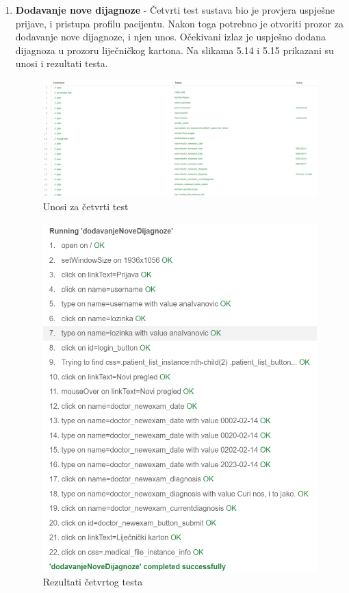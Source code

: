 \begin{enumerate}
			 	\item \textbf{Dodavanje nove dijagnoze} - Četvrti test sustava bio je provjera uspješne prijave, i pristupa profilu pacijentu. Nakon toga potrebno je otvoriti prozor za dodavanje nove dijagnoze, i njen unos. Očekivani izlaz je uspješno dodana dijagnoza u prozoru liječničkog kartona. Na slikama 5.14 i 5.15 prikazani su unosi i rezultati testa.
			 	\begin{figure}[H]
			 		\includegraphics[scale=0.3]{slike/testSustava8.PNG} %
			 		\centering
			 		\caption{Unosi za četvrti test}
			 		\label{fig:testsustava7}
			 	\end{figure}
			 	\begin{figure}[H]
			 		\includegraphics[scale=0.6]{slike/testSustava7.PNG} %
			 		\centering
			 		\caption{Rezultati četvrtog testa}
			 		\label{fig:testsustava8}
			 	\end{figure}
			 \end{enumerate}
			\eject 
		
